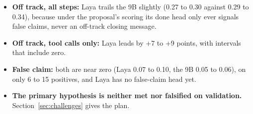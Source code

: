 \documentclass[10.5pt,a4paper]{article}
\begin{document}
\begin{itemize}
  \item \textbf{Off track, all steps:} Laya trails the 9B slightly (0.27 to 0.30 against 0.29 to 0.34), because under the proposal's scoring its done head only ever signals false claims, never an off-track closing message.
  \item \textbf{Off track, tool calls only:} Laya leads by +7 to +9 points, with intervals that include zero.
  \item \textbf{False claim:} both are near zero (Laya 0.07 to 0.10, the 9B 0.05 to 0.06), on only 6 to 15 positives, and Laya has no false-claim head yet.
  \item \textbf{The primary hypothesis is neither met nor falsified on validation.} Section~\ref{sec:challenges} gives the plan.
\end{itemize}

\end{document}
